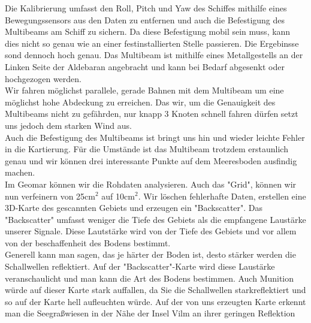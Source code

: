 Die Kalibrierung umfasst den Roll, Pitch und Yaw des Schiffes mithilfe eines Bewegungssensors aus den Daten zu 
entfernen und auch die Befestigung des Multibeams am Schiff zu sichern. Da diese Befestigung mobil sein muss, kann
dies nicht so genau wie an einer festinstallierten Stelle passieren. Die Ergebinsse sond dennoch hoch genau. 
Das Multibeam ist mithilfe eines Metallgestells an der Linken Seite der Aldebaran angebracht und kann bei Bedarf 
abgesenkt oder hochgezogen werden.\\

Wir fahren möglichst parallele, gerade Bahnen mit dem Multibeam um eine möglichst hohe Abdeckung zu erreichen. 
Das wir, um die Genauigkeit des Multibeams nicht zu gefährden, nur knapp 3 Knoten schnell fahren dürfen setzt
uns jedoch dem starken Wind aus. \\

Auch die Befestigung des Multibeams ist bringt uns hin und wieder leichte Fehler in die Kartierung. Für die 
Umstände ist das Multibeam trotzdem erstaunlich genau und wir können drei interessante Punkte auf dem 
Meeresboden ausfindig machen. \\
Im Geomar können wir die Rohdaten analysieren. Auch das "Grid", können wir nun verfeinern von 25cm$^2$ auf 10cm$^2$. 
Wir löschen fehlerhafte Daten, erstellen eine 3D-Karte des gescannten Gebiets und erzeugen ein "Backscatter". 
Das "Backscatter" umfasst weniger die Tiefe des Gebiets als die empfangene Laustärke unserer Signale. 
Diese Lautstärke wird von der Tiefe des Gebiets und vor allem von der beschaffenheit des Bodens bestimmt. \\

Generell kann man sagen, das je härter der Boden ist, desto stärker werden die Schallwellen reflektiert. 
Auf der "Backscatter"-Karte wird diese Laustärke veranschaulicht und man kann die Art des Bodens bestimmen.
Auch Munition würde auf dieser Karte stark auffallen, da Sie die Schallwellen starkreflektiert und so 
auf der Karte hell aufleuchten würde. Auf der von uns erzeugten Karte erkennt man die Seegraßwiesen in 
der Nähe der Insel Vilm an ihrer geringen Reflektion
